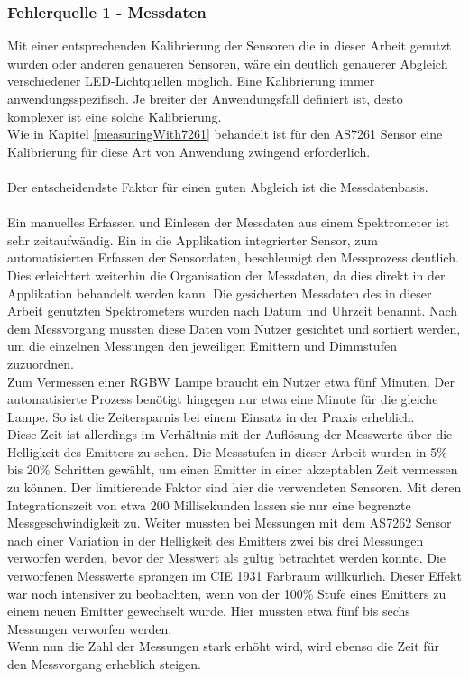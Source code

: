 \documentclass[11pt]{scrartcl}
\begin{document}
\subsubsection{Fehlerquelle 1 - Messdaten}
Mit einer entsprechenden Kalibrierung der Sensoren die in dieser Arbeit genutzt wurden oder anderen genaueren
Sensoren, wäre ein deutlich genauerer Abgleich verschiedener LED-Lichtquellen möglich. Eine Kalibrierung immer
anwendungsspezifisch. Je breiter der Anwendungsfall definiert ist, desto komplexer ist eine solche Kalibrierung.\\
Wie in Kapitel \ref{measuringWith7261} behandelt ist für den AS7261 Sensor eine Kalibrierung für diese Art von
Anwendung zwingend erforderlich.\\
\\
Der entscheidendste Faktor für einen guten Abgleich ist die Messdatenbasis.\\
\\
Ein manuelles Erfassen und Einlesen der Messdaten aus einem Spektrometer ist sehr zeitaufwändig. Ein in die
Applikation integrierter Sensor, zum automatisierten Erfassen der Sensordaten, beschleunigt den Messprozess
deutlich. Dies erleichtert weiterhin die Organisation der Messdaten, da dies direkt in der Applikation behandelt
werden kann. Die gesicherten Messdaten des in dieser Arbeit genutzten Spektrometers wurden nach Datum und
Uhrzeit benannt. Nach dem Messvorgang mussten diese Daten vom Nutzer gesichtet und sortiert werden, um die
einzelnen Messungen den jeweiligen Emittern und Dimmstufen zuzuordnen.\\
Zum Vermessen einer RGBW Lampe braucht ein Nutzer etwa fünf Minuten. Der automatisierte Prozess benötigt hingegen
nur etwa eine Minute für die gleiche Lampe. So ist die Zeitersparnis bei einem Einsatz in der
Praxis erheblich.\\
Diese Zeit ist allerdings im Verhältnis mit der Auflösung der Messwerte über die Helligkeit des Emitters zu sehen.
Die Messstufen in dieser Arbeit wurden in 5\% bis 20\% Schritten gewählt, um einen Emitter in einer akzeptablen Zeit
vermessen zu können. Der limitierende Faktor sind hier die verwendeten Sensoren. Mit deren Integrationszeit von etwa
200 Millisekunden lassen sie nur eine begrenzte Messgeschwindigkeit zu. Weiter mussten bei Messungen mit dem AS7262
Sensor nach einer Variation in der Helligkeit des Emitters zwei bis drei Messungen verworfen werden, bevor
der Messwert als gültig betrachtet werden konnte. Die verworfenen Messwerte sprangen im CIE 1931 Farbraum willkürlich.
Dieser Effekt war noch intensiver zu beobachten, wenn von der 100\% Stufe eines Emitters zu einem neuen Emitter
gewechselt wurde. Hier mussten etwa fünf bis sechs Messungen verworfen werden.\\
Wenn nun die Zahl der Messungen stark erhöht wird, wird ebenso die Zeit für den Messvorgang erheblich steigen.
\end{document}
